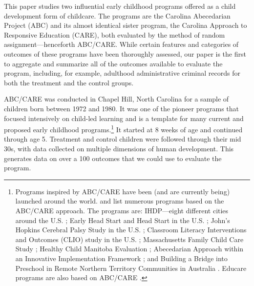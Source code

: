 

This paper studies two influential early childhood programs offered as a child development form of childcare. The programs are the Carolina Abecedarian Project (ABC) and its almost identical sister program, the Carolina Approach to Responsive Education (CARE), both evaluated by the method of random assignment---henceforth ABC/CARE. While certain features and categories of outcomes of these programs have been thoroughly assessed, our paper is the first to aggregate and summarize all of the outcomes available to evaluate the program, including, for example, adulthood administrative criminal records for both the treatment and the control groups.

ABC/CARE was conducted in Chapel Hill, North Carolina for a sample of children born between 1972 and 1980. It was one of the pioneer programs that focused intensively on child-led learning and is a template for many current and proposed early childhood programs.\footnote{Programs inspired by ABC/CARE have been (and are currently being) launched around the world. \citet{Sparling_2010_Highlights} and \citet{Ramey_Ramey_Lanzi_2014_Interventions} list numerous programs based on the ABC/CARE approach. The programs are: IHDP---eight different cities around the U.S. \citep{Spiker-etal_1997_Helping}; Early Head Start and Head Start in the U.S. \citep{Schneider_McDonald-eds_2007_Scale-Up_Vol-1}; John's Hopkins Cerebral Palsy Study in the U.S. \citep{Sparling_2010_Highlights}; Classroom Literacy Interventions and Outcomes (CLIO) study in the U.S. \citep{Sparling_2010_Highlights}; Massachusetts Family Child Care Study \citep{Collins_etal_2010_Massachusetts-Study}; Healthy Child Manitoba Evaluation \citep{Healthy_Child_Manitoba_2015_Starting-Early}; Abecedarian Approach within an Innovative Implementation Framework \citep{Jensen_Nielsen_2016_ABC-Programme-Pilot}; and Building a Bridge into Preschool in Remote Northern Territory Communities in Australia \citep{UMonash_Dataset_2015_URL}. Educare programs are also based on ABC/CARE \citep{Educare_2014_Research_Agenda,Yazejian_Bryant_2012_Educare}.} It started at 8 weeks of age and continued through age 5. Treatment and control children were followed through their mid 30s, with data collected on multiple dimensions of human development. This generates data on over a 100 outcomes that we could use to evaluate the program.

